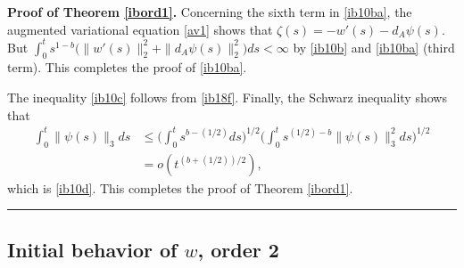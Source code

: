 \documentclass[12pt]{article}
\newenvironment{proof}[1][Proof]{\textbf{#1.} }{\ \rule{0.5em}{0.5em}}
\def \({\Big(}
\def \){\Big)}
\def \eref{\eqref}
\numberwithin{equation}{section}
\begin{document}
\begin{proof}[Proof of Theorem \ref{ibord1}]
 Concerning the sixth term in \eref{ib10ba}, the augmented variational equation \eref{av1} shows that 
 $\zeta(s) = - w'(s) - d_A \psi(s)$. But $\int_0^t s^{1-b}\(\|w'(s)\|_2^2 + \|d_A \psi(s)\|_2^2\) ds < \infty$
  by \eref{ib10b} and \eref{ib10ba} (third term). 
  This completes the proof of \eref{ib10ba}.  
 
 
 The inequality  \eref{ib10c}  follows from \eref{ib18f}. Finally, the Schwarz inequality shows that
 \begin{align*}
 \int_0^t \|\psi(s)\|_3 ds &\le \(\int_0^t s^{b-(1/2)} ds\)^{1/2} \(\int_0^ts^{(1/2)-b} \|\psi(s)\|_3^2 ds\)^{1/2} \\
 &= o(t^{(b +(1/2))/2}),
 \end{align*}
 which is \eref{ib10d}. 
This completes the proof of Theorem \ref{ibord1}.
 \end{proof}




\subsection{Initial behavior of $w$, order 2}     \label{secib2}
\end{document}
